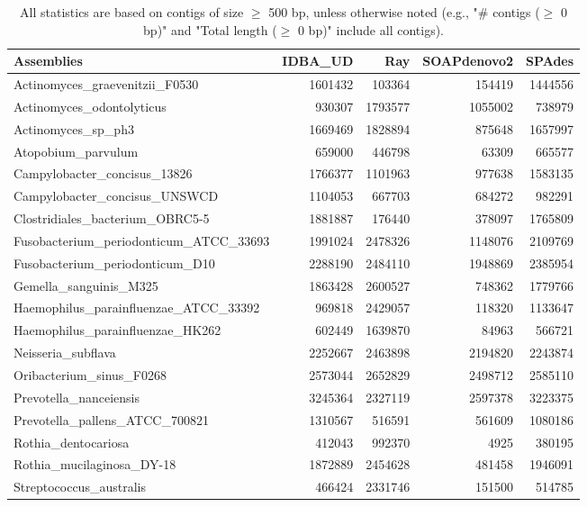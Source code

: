 \documentclass[12pt,a4paper]{article}
\begin{document}
\begin{table}[ht]
\begin{center}
\caption{All statistics are based on contigs of size $\geq$ 500 bp, unless otherwise noted (e.g., "\# contigs ($\geq$ 0 bp)" and "Total length ($\geq$ 0 bp)" include all contigs).}
\begin{tabular}{|l*{4}{|r}|}
\hline
Assemblies & IDBA\_UD & Ray & SOAPdenovo2 & SPAdes \\ \hline
Actinomyces\_graevenitzii\_F0530 & 1601432 & 103364 & 154419 & 1444556 \\ \hline
Actinomyces\_odontolyticus & 930307 & 1793577 & 1055002 & 738979 \\ \hline
Actinomyces\_sp\_ph3 & 1669469 & 1828894 & 875648 & 1657997 \\ \hline
Atopobium\_parvulum & 659000 & 446798 & 63309 & 665577 \\ \hline
Campylobacter\_concisus\_13826 & 1766377 & 1101963 & 977638 & 1583135 \\ \hline
Campylobacter\_concisus\_UNSWCD & 1104053 & 667703 & 684272 & 982291 \\ \hline
Clostridiales\_bacterium\_OBRC5-5 & 1881887 & 176440 & 378097 & 1765809 \\ \hline
Fusobacterium\_periodonticum\_ATCC\_33693 & 1991024 & 2478326 & 1148076 & 2109769 \\ \hline
Fusobacterium\_periodonticum\_D10 & 2288190 & 2484110 & 1948869 & 2385954 \\ \hline
Gemella\_sanguinis\_M325 & 1863428 & 2600527 & 748362 & 1779766 \\ \hline
Haemophilus\_parainfluenzae\_ATCC\_33392 & 969818 & 2429057 & 118320 & 1133647 \\ \hline
Haemophilus\_parainfluenzae\_HK262 & 602449 & 1639870 & 84963 & 566721 \\ \hline
Neisseria\_subflava & 2252667 & 2463898 & 2194820 & 2243874 \\ \hline
Oribacterium\_sinus\_F0268 & 2573044 & 2652829 & 2498712 & 2585110 \\ \hline
Prevotella\_nanceiensis & 3245364 & 2327119 & 2597378 & 3223375 \\ \hline
Prevotella\_pallens\_ATCC\_700821 & 1310567 & 516591 & 561609 & 1080186 \\ \hline
Rothia\_dentocariosa & 412043 & 992370 & 4925 & 380195 \\ \hline
Rothia\_mucilaginosa\_DY-18 & 1872889 & 2454628 & 481458 & 1946091 \\ \hline
Streptococcus\_australis & 466424 & 2331746 & 151500 & 514785 \\ \hline

\end{tabular}
\end{center}
\end{table}
\end{document}
